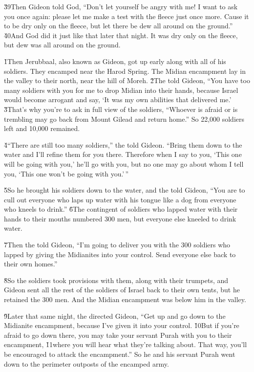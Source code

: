 \v{39}Then Gideon told God, ``Don't let yourself be angry with me! I want to ask you once again: please let me make a test with the fleece just once more. Cause it to be dry only on the fleece, but let there be dew all around on the ground.'' \v{40}And God did it just like that later that night. It was dry only on the fleece, but dew was all around on the ground.

\v{1}Then Jerubbaal, also known as Gideon, got up early along with all of his soldiers. They encamped near the Harod Spring. The Midian encampment lay in the valley to their north, near the hill of Moreh. \v{2}The  told Gideon, ``You have too many soldiers with you for me to drop Midian into their hands, because Israel would become arrogant and say, `It was my own abilities that delivered me.' \v{3}That's why you're to ask in full view of the soldiers, ``Whoever is afraid or is trembling may go back from Mount Gilead and return home.'' So 22,000 soldiers left and 10,000 remained.

\v{4}``There are still too many soldiers,'' the  told Gideon. ``Bring them down to the water and I'll refine them for you there. Therefore when I say to you, `This one will be going with you,' he'll go with you, but no one may go about whom I tell you, `This one won't be going with you.'\,''

\v{5}So he brought his soldiers down to the water, and the  told Gideon, ``You are to cull out everyone who laps up water with his tongue like a dog from everyone who kneels to drink.'' \v{6}The contingent of soldiers who lapped water with their hands to their mouths numbered 300 men, but everyone else kneeled to drink water.

\v{7}Then the  told Gideon, ``I'm going to deliver you with the 300 soldiers who lapped by giving the Midianites into your control. Send everyone else back to their own homes.''

\v{8}So the soldiers took provisions with them, along with their trumpets, and Gideon sent all the rest of the soldiers of Israel back to their own tents, but he retained the 300 men. And the Midian encampment was below him in the valley.

\v{9}Later that same night, the  directed Gideon, ``Get up and go down to the Midianite encampment, because I've given it into your control. \v{10}But if you're afraid to go down there, you may take your servant Purah with you to their encampment, \v{11}where you will hear what they're talking about. That way, you'll be encouraged to attack the encampment.'' So he and his servant Purah went down to the perimeter outposts of the encamped army.

